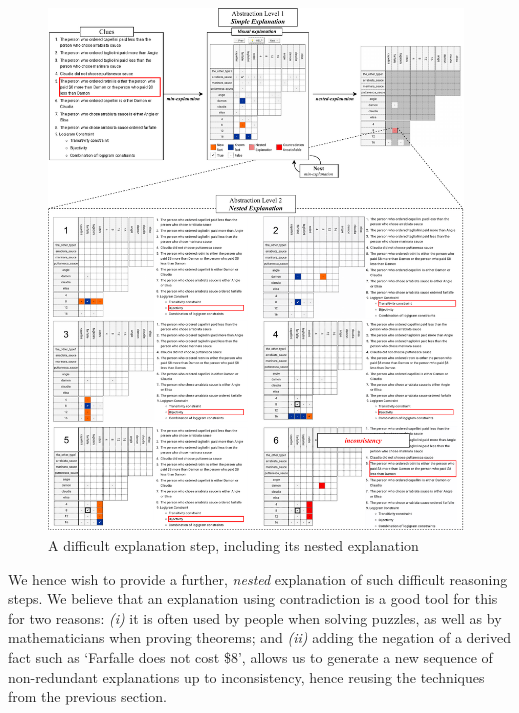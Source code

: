 \begin{figure}[h!]
	\centering
     \includegraphics[width=0.98\textwidth]{figures/aijournal_ijcai_demo-aijournal_other_explanation_2.pdf}
    \caption{A difficult explanation step, including its nested explanation}\label{fig:pasta_diff}
\end{figure}

We hence wish to provide a further, \textit{nested} explanation of such difficult reasoning steps. We believe that an explanation using contradiction is a good tool for this for two reasons: 
\emph{(i)} it is often used by people when solving puzzles, as well as by mathematicians when proving theorems; and 
\emph{(ii)} adding the negation of a derived fact such as `Farfalle does not cost \$8', allows us to generate a new sequence of non-redundant explanations up to inconsistency, hence reusing the techniques from the previous section. 


